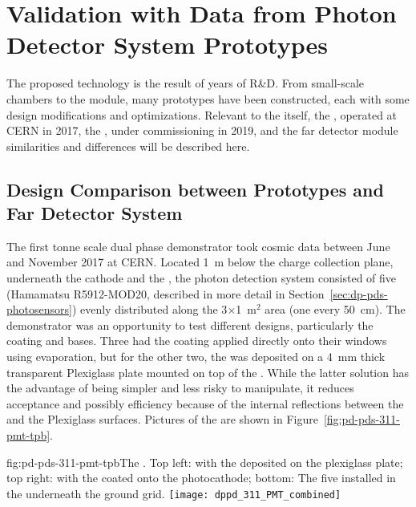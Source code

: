 \section{Validation with Data from Photon Detector System Prototypes}
\label{sec:dp-pds-prototypes}

The    proposed technology is the result of years of R\&D. From small-scale chambers to the  module, many prototypes have been constructed, each with some design modifications and optimizations. 
Relevant to the  itself, the , operated at CERN in 2017, the , under commissioning in 2019, and the  far detector module similarities and differences will be described here.

\subsection{Design Comparison between Prototypes and Far Detector System}
The first tonne scale dual phase   demonstrator took cosmic data between June and November \num{2017} at CERN. 
Located \SI{1}{m} below the charge collection plane, underneath the cathode and the , the photon detection system consisted of five  (Hamamatsu R5912-MOD20, described in more detail in Section~\ref{sec:dp-pds-photosensors}) evenly distributed along the 3$\times$1~m$^2$ area (one  every \SI{50}{cm}). The demonstrator was an opportunity to test different  designs, particularly the  coating and  bases. Three  had the  coating applied directly onto their windows using evaporation, but for the other two, the  was deposited on a \SI{4}{\mm} thick transparent Plexiglass plate mounted on top of the . 
While the latter solution has the advantage of being simpler and less risky to manipulate, it reduces acceptance and possibly efficiency because of the internal reflections between the  and the Plexiglass surfaces. 
Pictures of the   are shown in Figure~\ref{fig:pd-pds-311-pmt-tpb}.

\begin{dunefigure}{fig:pd-pds-311-pmt-tpb}{The  . Top left:  with the  deposited on the plexiglass plate; top right:  with the  coated onto the photocathode; bottom: The five  installed in the  underneath the ground grid.}
\texttt{[image: dppd\_311\_PMT\_combined]}
\end{dunefigure}

